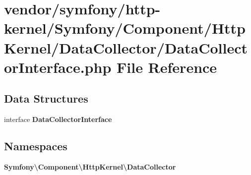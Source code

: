 \section{vendor/symfony/http-\/kernel/\+Symfony/\+Component/\+Http\+Kernel/\+Data\+Collector/\+Data\+Collector\+Interface.php File Reference}
\label{_data_collector_interface_8php}
\subsection*{Data Structures}
\begin{DoxyCompactItemize}
\item 
interface {\bf Data\+Collector\+Interface}
\end{DoxyCompactItemize}
\subsection*{Namespaces}
\begin{DoxyCompactItemize}
\item 
 {\bf Symfony\textbackslash{}\+Component\textbackslash{}\+Http\+Kernel\textbackslash{}\+Data\+Collector}
\end{DoxyCompactItemize}
